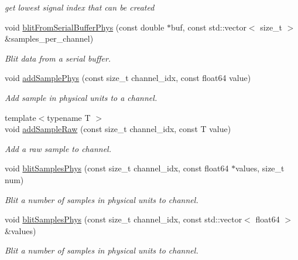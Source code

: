 \begin{DoxyCompactItemize}
\begin{DoxyCompactList}\small\item\em get lowest signal index that can be created \item\end{DoxyCompactList}\item 
void \hyperlink{classgdf_1_1_writer_a78c344714054c13d96e0c85af24ad19f}{blitFromSerialBufferPhys} (const double $\ast$buf, const std::vector$<$ size\_\-t $>$ \&samples\_\-per\_\-channel)
\begin{DoxyCompactList}\small\item\em Blit data from a serial buffer. \item\end{DoxyCompactList}\item 
void \hyperlink{classgdf_1_1_writer_aeb0e491af4de91e79469634d8b3ecc5d}{addSamplePhys} (const size\_\-t channel\_\-idx, const float64 value)
\begin{DoxyCompactList}\small\item\em Add sample in physical units to a channel. \item\end{DoxyCompactList}\item 
{\footnotesize template$<$typename T $>$ }\\void \hyperlink{classgdf_1_1_writer_a072237c5d82136be71668611a27111fc}{addSampleRaw} (const size\_\-t channel\_\-idx, const T value)
\begin{DoxyCompactList}\small\item\em Add a raw sample to channel. \item\end{DoxyCompactList}\item 
void \hyperlink{classgdf_1_1_writer_a3e01dfba57c77e5cac1db767de79b650}{blitSamplesPhys} (const size\_\-t channel\_\-idx, const float64 $\ast$values, size\_\-t num)
\begin{DoxyCompactList}\small\item\em Blit a number of samples in physical units to channel. \item\end{DoxyCompactList}\item 
void \hyperlink{classgdf_1_1_writer_af8b7e224467b9b706e4eaec7672d8399}{blitSamplesPhys} (const size\_\-t channel\_\-idx, const std::vector$<$ float64 $>$ \&values)
\begin{DoxyCompactList}\small\item\em Blit a number of samples in physical units to channel. \item\end{DoxyCompactList}\item 

\end{DoxyCompactItemize}
